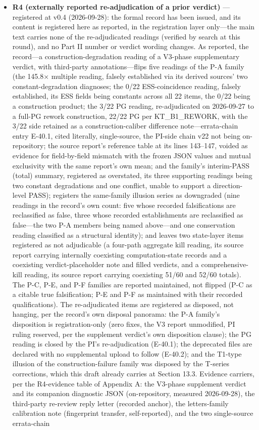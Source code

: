 \documentclass[11pt]{article}
\begin{document}
\begin{itemize}[leftmargin=1.6em,itemsep=2pt,parsep=0pt,topsep=3pt]
\item \textbf{R4 (externally reported re-adjudication of a prior verdict)} — registered at v0.4 (2026-09-28): the formal record has been issued, and its content is registered here as reported, in the registration layer only—the main text carries none of the re-adjudicated readings (verified by search at this round), and no Part II number or verdict wording changes. As reported, the record—a construction-degradation reading of a V3-phase supplementary verdict, with third-party annotations—flips five readings of the P-A family (the 145.8× multiple reading, falsely established via its derived sources' two constant-degradation diagnoses; the 0/22 ESS-coincidence reading, falsely established, its ESS fields being constants across all 22 items, the 0/22 being a construction product; the 3/22 PG reading, re-adjudicated on 2026-09-27 to a full-PG rework construction, 22/22 PG per KT\_B1\_REWORK, with the 3/22 side retained as a construction-caliber difference note—errata-chain entry E-40.1, cited literally, single-source, the PI-side chain v22 not being on-repository; the source report's reference table at its lines 143–147, voided as evidence for field-by-field mismatch with the frozen JSON values and mutual exclusivity with the same report's own mean; and the family's interim-PASS (total) summary, registered as overstated, its three supporting readings being two constant degradations and one conflict, unable to support a direction-level PASS); registers the same-family illusion series as downgraded (nine readings in the record's own count: five whose recorded falsifications are reclassified as false, three whose recorded establishments are reclassified as false—the two P-A members being named above—and one conservation reading classified as a structural identity); and leaves two state-layer items registered as not adjudicable (a four-path aggregate kill reading, its source report carrying internally coexisting computation-state records and a coexisting verdict-placeholder note and filled verdicts, and a comprehensive-kill reading, its source report carrying coexisting 51/60 and 52/60 totals). The P-C, P-E, and P-F families are reported maintained, not flipped (P-C as a citable true falsification; P-E and P-F as maintained with their recorded qualifications). The re-adjudicated items are registered as disposed, not hanging, per the record's own disposal panorama: the P-A family's disposition is registration-only (zero fixes, the V3 report unmodified, PI ruling reserved, per the supplement verdict's own disposition clause); the PG reading is closed by the PI's re-adjudication (E-40.1); the deprecated files are declared with no supplemental upload to follow (E-40.2); and the T1-type illusion of the construction-failure family was disposed by the T-series corrections, which this draft already carries at Section 13.3. Evidence carriers, per the R4-evidence table of Appendix A: the V3-phase supplement verdict and its companion diagnostic JSON (on-repository, measured 2026-09-28), the third-party re-review reply letter (recorded anchor), the letters-family calibration note (fingerprint transfer, self-reported), and the two single-source errata-chain 
\end{itemize}
\end{document}
